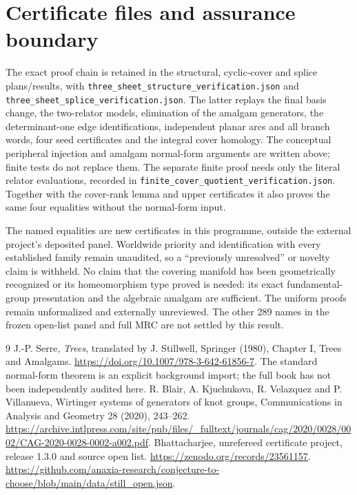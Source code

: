 \documentclass[11pt]{article}
\begin{document}
\section{Certificate files and assurance boundary}

The exact proof chain is retained in the structural, cyclic-cover
and splice plans/results, with
\texttt{three\_sheet\_structure\_verification.json} and
\texttt{three\_sheet\_splice\_verification.json}. The latter
replays the final basis change, the two-relator models,
elimination of the amalgam generators, the determinant-one
edge identifications, independent planar arcs and all branch
words, four seed certificates and the integral cover homology.
The conceptual peripheral injection and amalgam normal-form
arguments are written above; finite tests do not replace them.
The separate finite proof needs only the literal relator
evaluations, recorded in
\texttt{finite\_cover\_quotient\_verification.json}.
Together with the cover-rank lemma and upper certificates it
also proves the same four equalities without the normal-form input.

The named equalities are new certificates in this programme,
outside the external project's deposited panel. Worldwide
priority and identification with every established family
remain unaudited, so a ``previously unresolved'' or novelty
claim is withheld. No claim that the covering manifold has
been geometrically recognized or its homeomorphism type
proved is needed: its exact fundamental-group presentation
and the algebraic amalgam are sufficient. The uniform proofs
remain unformalized and externally unreviewed. The other 289
names in the frozen open-list panel and full MRC are not
settled by this result.

\begin{thebibliography}{9}
 J.-P. Serre, \emph{Trees}, translated by J. Stillwell,
Springer (1980), Chapter I, Trees and Amalgams.
\url{https://doi.org/10.1007/978-3-642-61856-7}.
The standard normal-form theorem is an explicit background import;
the full book has not been independently audited here.
 R. Blair, A. Kjuchukova, R. Velazquez and P. Villanueva,
Wirtinger systems of generators of knot groups,
Communications in Analysis and Geometry 28 (2020), 243--262.
\url{https://archive.intlpress.com/site/pub/files/_fulltext/journals/cag/2020/0028/0002/CAG-2020-0028-0002-a002.pdf}.
 Bhattacharjee, unrefereed certificate project,
release 1.3.0 and source open list.
\url{https://zenodo.org/records/23561157}.
\url{https://github.com/anaxia-research/conjecture-to-choose/blob/main/data/still_open.json}.
\end{thebibliography}
\end{document}
